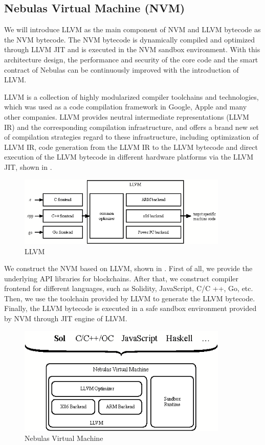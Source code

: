\subsection{Nebulas Virtual Machine (NVM)}
\label{sec:nvm}

We will introduce LLVM \cite{llvm} as the main component of NVM and
LLVM bytecode as the NVM bytecode. The NVM bytecode is dynamically
compiled and optimized through LLVM JIT and is executed in the NVM sandbox environment. With this architecture design, the performance and security of the core code and the smart contract of Nebulas can be continuously improved with the introduction of LLVM.

LLVM is a collection of highly modularized compiler toolchains and
technologies, which was used as a code compilation framework in Google, Apple
and many other companies. LLVM provides neutral intermediate representations
(LLVM IR) and the corresponding compilation infrastructure, and offers a brand
new set of compilation strategies regard to these infrastructure, including
optimization of LLVM IR, code generation from the LLVM IR to the LLVM bytecode
and direct execution of the LLVM bytecode in different hardware platforms via
the LLVM JIT, shown in . \\

\begin{figure}[h]
\centering
\includegraphics[width=10cm]{./figs/llvm}
\caption{LLVM}
\label{fig:llvm}
\end{figure}

We construct the NVM based on LLVM, shown in . First
of all, we provide the underlying API libraries for blockchains. After that, we
construct compiler frontend for different languages, such as Solidity,
JavaScript, C/C ++, Go, etc. Then, we use the toolchain provided by LLVM to
generate the LLVM bytecode. Finally, the LLVM bytecode is executed in a safe
sandbox environment provided by NVM through JIT engine of LLVM.

\begin{figure}[h]
\centering
\includegraphics[width=10cm]{./figs/nvm}
\caption{Nebulas Virtual Machine}
\label{fig:nvm}
\end{figure}

